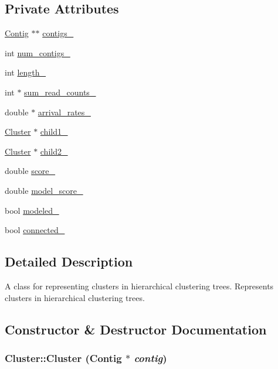 \subsection*{Private Attributes}
\begin{DoxyCompactItemize}
\item 
\hyperlink{classContig}{Contig} $\ast$$\ast$ \hyperlink{classCluster_abf682e9b3a02a8188606551b846560d6}{contigs\_\-}
\item 
int \hyperlink{classCluster_a61cd37076cceb450e29110bd7f9aec06}{num\_\-contigs\_\-}
\item 
int \hyperlink{classCluster_ac94216ba6a05b51f363978088164aab9}{length\_\-}
\item 
int $\ast$ \hyperlink{classCluster_a8769dcdea90ef8b097af10ba2ed506ad}{sum\_\-read\_\-counts\_\-}
\item 
double $\ast$ \hyperlink{classCluster_a36ca822c0abc99d2f1b961a2bb761891}{arrival\_\-rates\_\-}
\item 
\hyperlink{classCluster}{Cluster} $\ast$ \hyperlink{classCluster_a6ffa9739a418a6c0de5898a05fad3c1f}{child1\_\-}
\item 
\hyperlink{classCluster}{Cluster} $\ast$ \hyperlink{classCluster_a715210b5163bc07d4835556332812059}{child2\_\-}
\item 
double \hyperlink{classCluster_a2de8478f1b4c40b426c8723b38d4d942}{score\_\-}
\item 
double \hyperlink{classCluster_ab415255559e42e87143a1c86acabf5e9}{model\_\-score\_\-}
\item 
bool \hyperlink{classCluster_a4649800ea7d9f5a893dd0259e07ed37a}{modeled\_\-}
\item 
bool \hyperlink{classCluster_ab3bf6a835394cd4d00d5381fb49f7180}{connected\_\-}
\end{DoxyCompactItemize}


\subsection{Detailed Description}
A class for representing clusters in hierarchical clustering trees. Represents clusters in hierarchical clustering trees. 

\subsection{Constructor \& Destructor Documentation}
\hypertarget{classCluster_a9f69adb0b24c9d63ef3a95902c07480d}{
\subsubsection[{Cluster}]{\setlength{\rightskip}{0pt plus 5cm}Cluster::Cluster ({\bf Contig} $\ast$ {\em contig})}}
\label{classCluster_a9f69adb0b24c9d63ef3a95902c07480d}


